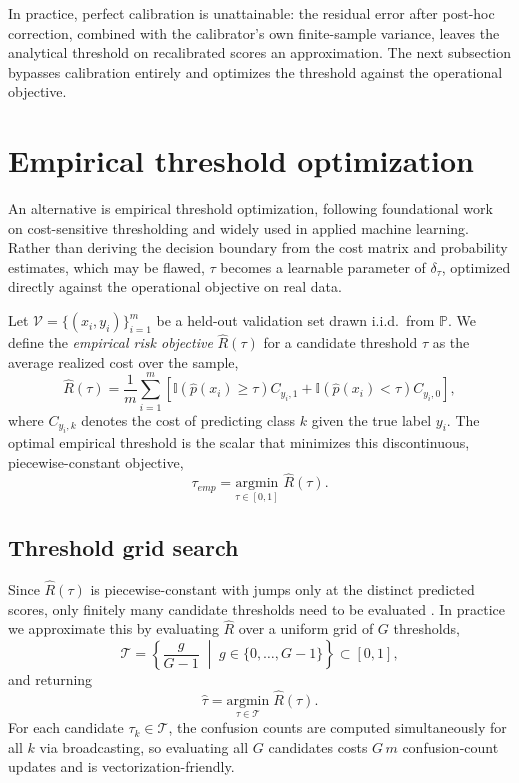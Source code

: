 In practice, perfect calibration is unattainable: the residual error after post-hoc correction, combined with the calibrator's own finite-sample variance, leaves the analytical threshold on recalibrated scores an approximation. The next subsection bypasses calibration entirely and optimizes the threshold against the operational objective.

\section{Empirical threshold optimization}\label{sec:empirical_threshold}

An alternative is empirical threshold optimization, following foundational work on cost-sensitive thresholding \citep{sheng2006thresholding} and widely used in applied machine learning. Rather than deriving the decision boundary from the cost matrix and probability estimates, which may be flawed, $\tau$ becomes a learnable parameter of $\delta_\tau$, optimized directly against the operational objective on real data.

Let $\mathcal{V} = \{(x_i, y_i)\}_{i=1}^m$ be a held-out validation set drawn i.i.d.\ from $\mathbb{P}$. We define the \emph{empirical risk objective} $\hat{R}(\tau)$ for a candidate threshold $\tau$ as the average realized cost over the sample,
\begin{equation}\label{eq:empirical_risk_obj}
    \hat{R}(\tau) = \frac{1}{m} \sum_{i=1}^m \left[ \mathbb{I}(\hat{p}(x_i) \ge \tau) C_{y_i, 1} + \mathbb{I}(\hat{p}(x_i) < \tau) C_{y_i, 0} \right],
\end{equation}
where $C_{y_i, k}$ denotes the cost of predicting class $k$ given the true label $y_i$. The optimal empirical threshold is the scalar that minimizes this discontinuous, piecewise-constant objective,
\begin{equation}
    \tau_{emp} = \underset{\tau \in [0, 1]}{\mathrm{argmin}} \,\, \hat{R}(\tau).
\end{equation}

\subsection{Threshold grid search}\label{sec:threshold_grid_search}

Since $\hat{R}(\tau)$ is piecewise-constant with jumps only at the distinct predicted scores, only finitely many candidate thresholds need to be evaluated \citep{provost2001robust}. In practice we approximate this by evaluating $\hat{R}$ over a uniform grid of $G$ thresholds,
\begin{equation}
    \mathcal{T} = \left\{ \frac{g}{G-1} \;\middle|\; g \in \{0, \dots, G-1\} \right\} \subset [0,1],
\end{equation}
and returning
\begin{equation}
    \hat{\tau} = \underset{\tau \in \mathcal{T}}{\mathrm{argmin}} \; \hat{R}(\tau).
\end{equation}
For each candidate $\tau_k \in \mathcal{T}$, the confusion counts are computed simultaneously for all $k$ via broadcasting, so evaluating all $G$ candidates costs $G\,m$ confusion-count updates and is vectorization-friendly.


